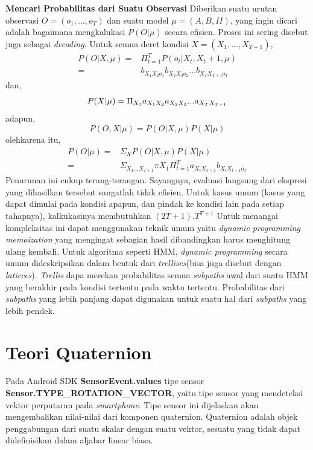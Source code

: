 \textbf{Mencari Probabilitas dari Suatu Observasi}
Diberikan suatu urutan observasi \(O = (o_1,...,o_T)\) dan suatu model \(\mu = (A,B,II)\), yang ingin dicari adalah bagaimana mengkalukasi \(P(O|\mu )\) secara efisien. Proses ini sering disebut juga sebagai \textit{decoding}. Untuk semua deret kondisi \(X = (X_1,...,X_{T+1})\),
\begin{align*}
	P(O|X,\mu ) =& \Pi^{T}_{t=1} P(o_t|X_t,X_t+1,\mu )\\
		=& b_{X_1 X_2 o_1}b_{X_2 X_3 o_2}... b_{X_T X_{T+1}o_T}
\end{align*}
dan, 
\[
	P(X|\mu ) = \Pi_{X_1}a_{X_1 X_2}a_{X_2 X_3}...a_{X_T X_{T+1}}\\
\]
adapun,
\[
	P(O,X|\mu ) = P(O|X,\mu ) P(X|\mu )
\]
olehkarena itu, 
\begin{align*}
	P(O|\mu ) =& \Sigma_X P(O|X,\mu ) P(X|\mu )\\
	=& \Sigma_{X_1 ...X_{T+1}} \pi X_1 \Pi^{T}_{t=1} a_{X_t X_{T+1}}b_{X_t X_{t+1}o_T}
\end{align*}
Penurunan ini cukup terang-terangan. Sayangnya, evaluasi langsung dari ekspresi yang dihasilkan tersebut sangatlah tidak efisien. Untuk kasus umum (kasus yang dapat dimulai pada kondisi apapun, dan pindah ke kondisi lain pada setiap tahapnya), kalkukasinya membutuhkan \((2T+1).T^{T+1}\) Untuk menangai kompleksitas ini dapat menggunakan teknik umum yaitu \textit{dynamic programming memoization} yang mengingat sebagian hasil dibandingkan harus menghitung ulang kembali. Untuk algoritma seperti HMM, \textit{dynamic programming} secara umum dideskripsikan dalam bentuk dari \textit{trellises}(bisa juga disebut dengan \textit{laticces}). \textit{Trellis} dapa merekan probabilitas semua \textit{subpaths} awal dari suatu HMM yang berakhir pada kondisi tertentu pada waktu tertentu. Probabilitas dari \textit{subpaths} yang lebih panjang dapat digunakan untuk suatu hal dari \textit{subpaths} yang lebih pendek.
\section{Teori Quaternion}
\label{sec:teori_quaternion}
Pada Android SDK \textbf{SensorEvent.values} \cite{android_developers} tipe sensor \textbf{Sensor.TYPE\_ROTATION\_VECTOR}, yaitu tipe sensor yang mendeteksi vektor perputaran pada \textit{smartphone}. Tipe sensor ini dijelaskan akan mengembalikan nilai-nilai dari komponen quaternion. 
Quaternion\cite{kuipers:1999} adalah objek penggabungan dari suatu skalar dengan suatu vektor, sesuatu yang tidak dapat didefinisikan dalam aljabar linear biasa. 

